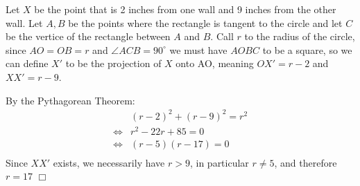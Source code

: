 \begin{solution}[D] 
    Let $X$ be the point that is 2 inches from one wall and 9 inches from the other wall. Let $A,B$ be the points where the rectangle is tangent to the circle and let $C$ be the vertice of the rectangle between $A$ and $B$.
    Call $r$ to the radius of the circle, since $AO=OB=r$ and $\angle ACB = 90^\circ$ we
    must have $AOBC$ to be a square, so we can define $X'$ to be the projection of $X$ onto 
    AO, meaning $OX'=r-2$ and $XX'=r-9$. 
    
    \noindent\begin{minipage}[t]{0.35\textwidth}\vspace{0pt}
        By the Pythagorean Theorem:
        \begin{align*}
            &(r-2)^2 + (r-9)^2 = r^2 \\
            \iff& r^2-22r+85=0 \\
            \iff& (r-5)(r-17)=0 \\
        \end{align*}
        Since $XX'$ exists, we necessarily have $r>9$, in particular $r \neq 5$, and therefore $r=17$ $\Box$
    \end{minipage}\hfill%
    \begin{minipage}[t]{0.62\textwidth}\vspace{-20pt}
        \begin{center}
        \end{center}
    \end{minipage} 
\end{solution}


